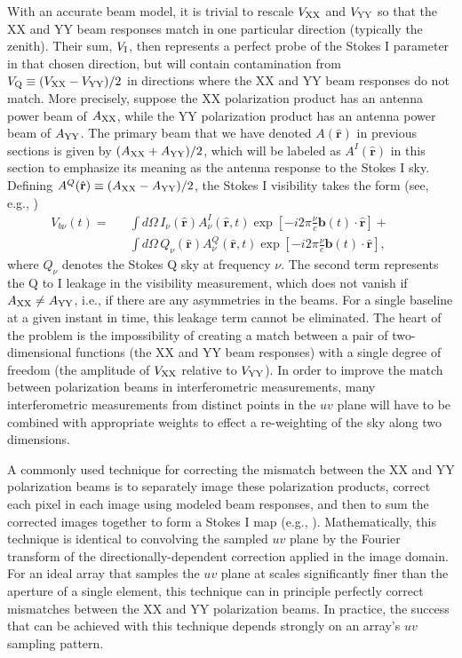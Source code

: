 \documentclass[twocolumn,apj,numberedappendix]{emulateapj}
\newcommand{\rhat}{\hat{\mathbf{r}}}
\begin{document}
With an accurate beam model, it is trivial to rescale ${V_{\rm XX}}$ and ${V_{\rm YY}}$ 
so that the XX and YY beam responses match in one particular direction (typically the zenith).  Their sum, ${V_{\rm I}}$, then
represents a perfect probe of the Stokes I parameter in that chosen direction, but will contain contamination
from ${V_{\rm Q}}\equiv({V_{\rm XX}}-{V_{\rm YY}})/2$ in directions where the XX and YY beam responses do not match.
More precisely, suppose the XX polarization product has an antenna power beam of $A_{\rm XX}$, while the YY 
polarization product has an antenna power beam of $A_{\rm YY}$. The primary beam that we have denoted $A(\rhat)$ 
in previous sections is given by $(A_{\rm XX} + A_{\rm YY})/2$, which will be labeled as $A^I(\rhat)$ in this section to emphasize
its meaning as the antenna response to the Stokes I sky. Defining $A^Q(\rhat) \equiv (A_{\rm XX} - A_{\rm YY})/2$, the
Stokes I visibility takes the form (see, e.g., \citealt{moore_et_al2015})
\begin{eqnarray}
V_{b\nu}(t)= &&\int d\Omega \, {I_\nu(\rhat) A^I_\nu(\rhat,t) \exp \left[-i2\pi \frac{\nu}{c}  \mathbf{b}(t) \cdot \rhat\right]} + \nonumber \\
&& \int d\Omega \, {Q_\nu(\rhat) A^Q_\nu(\rhat,t) \exp \left[-i2\pi \frac{\nu}{c}  \mathbf{b}(t) \cdot \rhat\right]}, \qquad
\end{eqnarray}
where $Q_\nu$ denotes the Stokes Q sky at frequency $\nu$. The second term represents the Q to I leakage
in the visibility measurement, which does not vanish if $ A_{\rm XX} \neq A_{\rm YY}$, i.e., if there are
any asymmetries in the beams. For a single baseline at a given instant in time, this leakage term
cannot be eliminated. The heart of the problem is the impossibility of creating a match between a pair of two-dimensional functions (the
XX and YY beam responses) with a single degree of freedom (the amplitude of ${V_{\rm XX}}$ relative to ${V_{\rm YY}}$).  In order
to improve the match between polarization beams in interferometric measurements, many interferometric measurements
from distinct points in the $uv$ plane will have to be combined with appropriate weights to effect a re-weighting
of the sky along two dimensions.

A commonly used technique for correcting the mismatch between the XX and YY polarization beams is to separately
image these polarization products, correct each pixel in each image using modeled beam responses,
and then to sum the corrected images together to form a Stokes I map 
(e.g., \citealt{sullivan_et_al2012,bernardi_et_al2013,asad_et_al2015}).  Mathematically, this technique is identical to convolving the sampled
$uv$ plane by the Fourier transform of the directionally-dependent correction applied in the image domain. For an ideal
array that samples the $uv$ plane at scales significantly finer than the aperture of a single element, this technique can
in principle perfectly correct mismatches between the XX and YY polarization beams.
In practice, the success that can be achieved with this technique depends strongly on an array's $uv$ sampling pattern.
\end{document}
